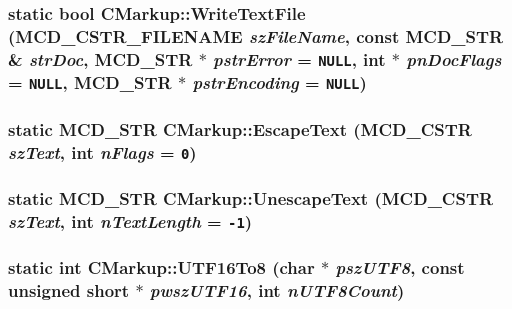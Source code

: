 \subsubsection[WriteTextFile]{\setlength{\rightskip}{0pt plus 5cm}static bool CMarkup::WriteTextFile (MCD\_\-CSTR\_\-FILENAME {\em szFileName}, \/  const MCD\_\-STR \& {\em strDoc}, \/  MCD\_\-STR $\ast$ {\em pstrError} = {\tt NULL}, \/  int $\ast$ {\em pnDocFlags} = {\tt NULL}, \/  MCD\_\-STR $\ast$ {\em pstrEncoding} = {\tt NULL})\hspace{0.3cm}{\tt  [static]}}\label{classCMarkup_983286cbcb7c4f9aa1f462ffb5dc641f}


\subsubsection[EscapeText]{\setlength{\rightskip}{0pt plus 5cm}static MCD\_\-STR CMarkup::EscapeText ({\bf MCD\_\-CSTR} {\em szText}, \/  int {\em nFlags} = {\tt 0})\hspace{0.3cm}{\tt  [static]}}\label{classCMarkup_ba91db9799ea46f2594a85f7026b6034}


\subsubsection[UnescapeText]{\setlength{\rightskip}{0pt plus 5cm}static MCD\_\-STR CMarkup::UnescapeText ({\bf MCD\_\-CSTR} {\em szText}, \/  int {\em nTextLength} = {\tt -1})\hspace{0.3cm}{\tt  [static]}}\label{classCMarkup_e4b84116d09deeeb06fdbb51a9550ad1}


\subsubsection[UTF16To8]{\setlength{\rightskip}{0pt plus 5cm}static int CMarkup::UTF16To8 (char $\ast$ {\em pszUTF8}, \/  const unsigned short $\ast$ {\em pwszUTF16}, \/  int {\em nUTF8Count})\hspace{0.3cm}{\tt  [static]}}\label{classCMarkup_cf38e3d9c2a76d33f942b15af22c36bd}


